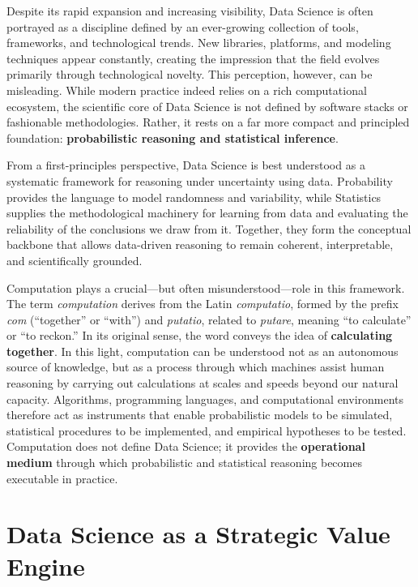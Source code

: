 \documentclass[
  12pt,
  letterpaper,
]{book}
\begin{document}
Despite its rapid expansion and increasing visibility, Data Science is
often portrayed as a discipline defined by an ever-growing collection of
tools, frameworks, and technological trends. New libraries, platforms,
and modeling techniques appear constantly, creating the impression that
the field evolves primarily through technological novelty. This
perception, however, can be misleading. While modern practice indeed
relies on a rich computational ecosystem, the scientific core of Data
Science is not defined by software stacks or fashionable methodologies.
Rather, it rests on a far more compact and principled foundation:
\textbf{probabilistic reasoning and statistical inference}.

From a first-principles perspective, Data Science is best understood as
a systematic framework for reasoning under uncertainty using data.
Probability provides the language to model randomness and variability,
while Statistics supplies the methodological machinery for learning from
data and evaluating the reliability of the conclusions we draw from it.
Together, they form the conceptual backbone that allows data-driven
reasoning to remain coherent, interpretable, and scientifically
grounded.

Computation plays a crucial---but often misunderstood---role in this
framework. The term \emph{computation} derives from the Latin
\emph{computatio}, formed by the prefix \emph{com} (``together'' or
``with'') and \emph{putatio}, related to \emph{putare}, meaning ``to
calculate'' or ``to reckon.'' In its original sense, the word conveys
the idea of \textbf{calculating together}. In this light, computation
can be understood not as an autonomous source of knowledge, but as a
process through which machines assist human reasoning by carrying out
calculations at scales and speeds beyond our natural capacity.
Algorithms, programming languages, and computational environments
therefore act as instruments that enable probabilistic models to be
simulated, statistical procedures to be implemented, and empirical
hypotheses to be tested. Computation does not define Data Science; it
provides the \textbf{operational medium} through which probabilistic and
statistical reasoning becomes executable in practice.

\section{Data Science as a Strategic Value
Engine}\label{data-science-as-a-strategic-value-engine}
\end{document}
